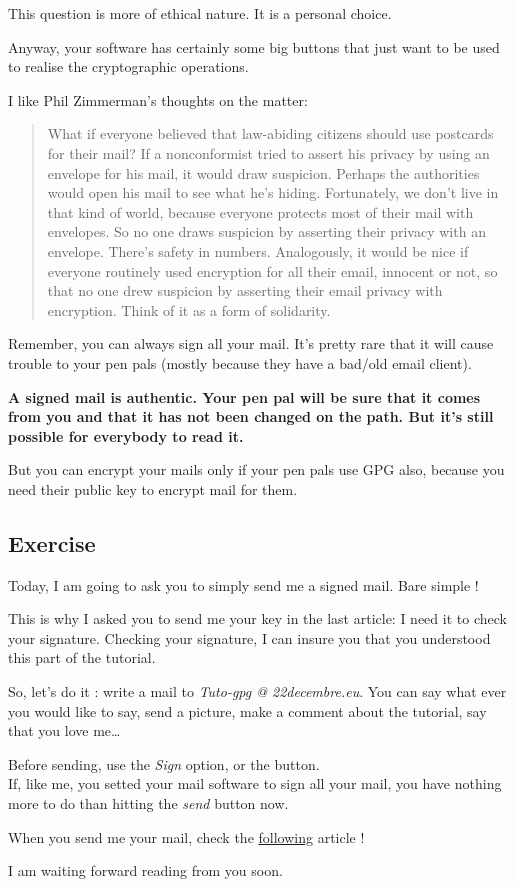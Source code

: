 This question is more of ethical nature. It is a personal choice.

Anyway, your software has certainly some big buttons that just want to
be used to realise the cryptographic operations.

I like Phil Zimmerman's thoughts on the matter:

\begin{quote}
What if everyone believed that law-abiding citizens should use postcards
for their mail? If a nonconformist tried to assert his privacy by using
an envelope for his mail, it would draw suspicion. Perhaps the
authorities would open his mail to see what he's hiding. Fortunately, we
don't live in that kind of world, because everyone protects most of
their mail with envelopes. So no one draws suspicion by asserting their
privacy with an envelope. There's safety in numbers. Analogously, it
would be nice if everyone routinely used encryption for all their email,
innocent or not, so that no one drew suspicion by asserting their email
privacy with encryption. Think of it as a form of solidarity.
\end{quote}

Remember, you can always sign all your mail. It's pretty rare that it
will cause trouble to your pen pals (mostly because they have a bad/old
email client).

\textbf{A signed mail is authentic. Your pen pal will be sure that it
comes from you and that it has not been changed on the path. But it's
still possible for everybody to read it.}

But you can encrypt your mails only if your pen pals use GPG also,
because you need their public key to encrypt mail for them.

\subsection{Exercise}\label{exercise}

Today, I am going to ask you to simply send me a signed mail. Bare
simple !

This is why I asked you to send me your key in the last article: I need
it to check your signature. Checking your signature, I can insure you
that you understood this part of the tutorial.

So, let's do it : write a mail to \emph{Tuto-gpg @ 22decembre.eu}. You
can say what ever you would like to say, send a picture, make a comment
about the tutorial, say that you love me\ldots{}

Before sending, use the \emph{Sign} option, or the button.\\If, like me,
you setted your mail software to sign all your mail, you have nothing
more to do than hitting the \emph{send} button now.

When you send me your mail, check the
\href{\{filename\}6-crypted-mail-en.md}{following} article !

I am waiting forward reading from you soon.
